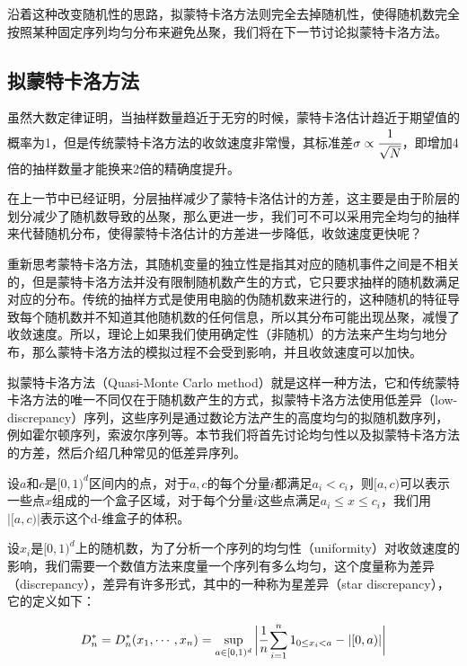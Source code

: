 沿着这种改变随机性的思路，拟蒙特卡洛方法则完全去掉随机性，使得随机数完全按照某种固定序列均匀分布来避免丛聚，我们将在下一节讨论拟蒙特卡洛方法。





\subsection{拟蒙特卡洛方法}\label{sec:quasi-monte-carlo}
虽然大数定律证明，当抽样数量趋近于无穷的时候，蒙特卡洛估计趋近于期望值的概率为1，但是传统蒙特卡洛方法的收敛速度非常慢，其标准差$\sigma\propto \cfrac{1}{\sqrt{N}}$，即增加4倍的抽样数量才能换来2倍的精确度提升。

在上一节中已经证明，分层抽样减少了蒙特卡洛估计的方差，这主要是由于阶层的划分减少了随机数导致的丛聚，那么更进一步，我们可不可以采用完全均匀的抽样来代替随机分布，使得蒙特卡洛估计的方差进一步降低，收敛速度更快呢？

重新思考蒙特卡洛方法，其随机变量的独立性是指其对应的随机事件之间是不相关的，但是蒙特卡洛方法并没有限制随机数产生的方式，它只要求抽样的随机数满足对应的分布。传统的抽样方式是使用电脑的伪随机数来进行的，这种随机的特征导致每个随机数并不知道其他随机数的任何信息，所以其分布可能出现丛聚，减慢了收敛速度。所以，理论上如果我们使用确定性（非随机）的方法来产生均匀地分布，那么蒙特卡洛方法的模拟过程不会受到影响，并且收敛速度可以加快。

拟蒙特卡洛方法（Quasi-Monte Carlo method）就是这样一种方法，它和传统蒙特卡洛方法的唯一不同仅在于随机数产生的方式，拟蒙特卡洛方法使用低差异（low-discrepancy）序列，这些序列是通过数论方法产生的高度均匀的拟随机数序列，例如霍尔顿序列，索波尔序列等。本节我们将首先讨论均匀性以及拟蒙特卡洛方法的方差，然后介绍几种常见的低差异序列。

设$a$和$c$是$[0,1)^d$区间内的点，对于$a,c$的每个分量$i$都满足$a_i<c_i$，则$[a,c)$可以表示一些点$x$组成的一个盒子区域，对于每个分量$i$这些点满足$a_i\leq x\leq c_i$，我们用$|[a,c)|$表示这个d-维盒子的体积。

设$x_i$是$[0,1)^d$上的随机数，为了分析一个序列的均匀性（uniformity）对收敛速度的影响，我们需要一个数值方法来度量一个序列有多么均匀，这个度量称为差异（discrepancy），差异有许多形式，其中的一种称为星差异（star discrepancy），它的定义如下：

\begin{equation}
	D^{*}_n=D^{*}_n(x_1,\cdots,x_n)=\sup_{a\in[0,1)^d}\bigg| \cfrac{1}{n}\sum^{n}_{i=1}1_{0\leq x_i<a}-|[0,a)|\bigg|
\end{equation}

